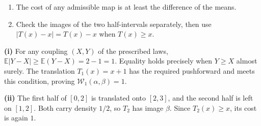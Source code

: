 \documentclass[11pt,a4paper]{article}
\theoremstyle{exostyle}
\newcommand{\Wone}{\mathcal{W}_1}
\begin{document}
\begin{hints}
\begin{enumerate}[label=(\roman*)]\item The cost of any admissible map is at least the difference of the means.\item Check the images of the two half-intervals separately, then use $|T(x)-x|=T(x)-x$ when $T(x)\ge x$.\end{enumerate}
\end{hints}
\begin{solution}
\textbf{(i)} For any coupling $(X,Y)$ of the prescribed laws,
$\mathbb E|Y-X|\ge\mathbb E(Y-X)=2-1=1$. Equality holds precisely when
$Y\ge X$ almost surely. The translation $T_1(x)=x+1$ has the required
pushforward and meets this condition, proving $\Wone(\alpha,\beta)=1$.

\textbf{(ii)} The first half of $[0,2]$ is translated onto $[2,3]$, and the second half is left on $[1,2]$. Both carry density $1/2$, so $T_2$ has image $\beta$. Since $T_2(x)\ge x$, its cost is again $1$.

\end{solution}
\end{document}
